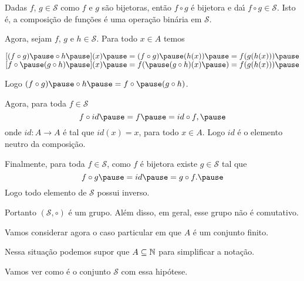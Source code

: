\documentclass{beamer}
\begin{document}
    \begin{frame}
        Dadas $f$, $g \in \mathcal{S}$ \pause como $f$ e $g$ são bijetoras, \pause então $f \circ g$ é bijetora \pause e da{\'\i} $f \circ g \in \mathcal{S}$. \pause Isto é, \pause a composição de funç\~oes \pause é uma operação binária em $\mathcal{S}$.

        \vspace{.3cm}

        Agora, sejam $f$, $g$ e $h \in \mathcal{S}$. \pause Para todo $x \in A$ temos\pause
        \begin{center}
            $[(f\circ g) \pause \circ h \pause](x) \pause = (f \circ g) \pause(h(x)) \pause = f(g(h(x))) \pause$\\
            $[f\circ \pause(g\circ h) \pause](x) \pause = f( \pause(g\circ h)(x) \pause) = f(g(h(x))) \pause$
        \end{center}

        Logo $(f\circ g) \pause \circ h  \pause = f\circ \pause (g\circ h)$. \pause

        \vspace{.3cm}

        Agora, para toda $f \in \mathcal{S}$\pause
        \[
            f\circ id  \pause = f  \pause = id\circ f, \pause
        \]
        onde $id : A \to A$ \pause é tal que $id(x) = x$, \pause para todo $x \in A$. \pause Logo $id$ é o elemento neutro da composição.\pause

    \end{frame}

    \begin{frame}

        Finalmente, \pause para toda $f \in \mathcal{S}$, \pause como $f$ é bijetora \pause existe $g \in \mathcal{S}$ \pause tal que \pause
        \[
            f\circ g \pause = id \pause = g \circ f. \pause
        \]
        Logo todo elemento de $\mathcal{S}$ \pause possui inverso. \pause

        \vspace{.3cm}

        Portanto $(\mathcal{S}, \circ)$ \pause é um grupo.  \pause Além disso, em geral, esse grupo não é comutativo. \pause

        \vspace{.3cm}

        Vamos considerar agora o caso particular \pause em que $A$ é um conjunto finito. \pause

        \vspace{.3cm}

        Nessa situação podemos supor que $A \subseteq \mathbb{N}$ \pause para simplificar a notação. \pause

        \vspace{.3cm}

        Vamos ver como é o conjunto $\mathcal{S}$ com essa hip\'otese. \pause
    \end{frame}
\end{document}
